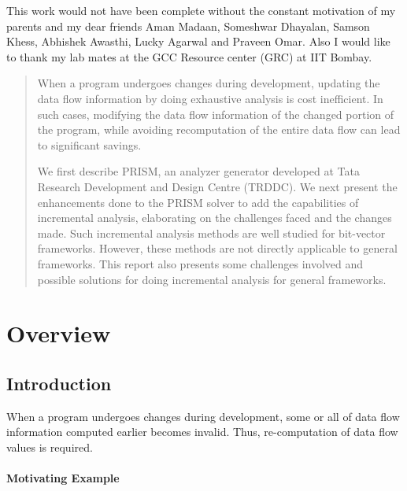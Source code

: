 \documentclass[11pt,a4paper,openright]{report}
\begin{document}
This work would not have been complete without the constant motivation of my parents and my dear friends Aman Madaan, Someshwar Dhayalan,
Samson Khess, Abhishek Awasthi, Lucky Agarwal and Praveen Omar. Also I would like to thank my lab mates at the GCC Resource center (GRC) at IIT Bombay.

\begin{abstract}

When a program undergoes changes during development, updating the
data flow information by doing exhaustive analysis is cost inefficient. In such cases,
modifying the data flow information of the changed portion of the program, while avoiding recomputation of the entire 
data flow can lead to significant savings.

We first describe PRISM, an analyzer generator developed at Tata Research Development and Design Centre (TRDDC).
We next present the enhancements done to the PRISM solver to add the capabilities of incremental analysis, elaborating on the challenges faced and the changes made. 
Such incremental analysis methods are well studied for bit-vector frameworks. 
However, these methods are not directly applicable to general frameworks. 
This report also presents some challenges involved and possible solutions for doing incremental analysis for general frameworks.

\end{abstract}
\newcommand*{\noaddvspace}{\renewcommand*{\addvspace}[1]{}}
\addtocontents{lof}{\protect\noaddvspace}
\tableofcontents

\listoftables

\listoffigures

\cleardoublepage
\setcounter{page}{1}
\chapter{Overview}
\section{Introduction}
When a program undergoes changes during development, some or all of data flow information computed earlier becomes invalid.
Thus, re-computation of data flow values is required.
\subsubsection{Motivating Example}
\end{document}
